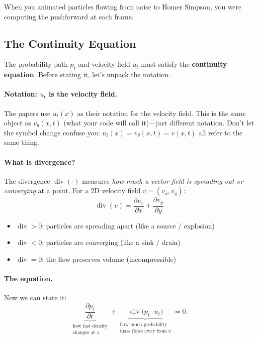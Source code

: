 \documentclass[11pt, a4paper]{article}
\newcommand{\vtheta}{v_\theta}
\DeclareMathOperator{\Div}{div}
\begin{document}
When you animated particles flowing from noise to Homer Simpson, you were
computing the pushforward at each frame.


\subsection{The Continuity Equation}
\label{sec:continuity}

The probability path $p_t$ and velocity field $u_t$ must satisfy the
\textbf{continuity equation}.  Before stating it, let's unpack the notation.

\paragraph{Notation: $u_t$ is the velocity field.}
The papers use $u_t(x)$ as their notation for the velocity field.  This is
the same object as $\vtheta(x,t)$ (what your code will call it)---just
different notation.  Don't let the symbol change confuse you:
$u_t(x) = \vtheta(x,t) = v(x,t)$ all refer to the same thing.

\paragraph{What is divergence?}
The divergence $\Div(\cdot)$ measures \emph{how much a vector field is
spreading out or converging} at a point.  For a 2D velocity field
$v = (v_x, v_y)$:
\[
  \Div(v) = \frac{\partial v_x}{\partial x} + \frac{\partial v_y}{\partial y}
\]

\begin{itemize}
  \item $\Div > 0$: particles are spreading apart (like a source / explosion)
  \item $\Div < 0$: particles are converging (like a sink / drain)
  \item $\Div = 0$: the flow preserves volume (incompressible)
\end{itemize}

\paragraph{The equation.}
Now we can state it:
\begin{equation}
  \label{eq:continuity}
  \underbrace{\frac{\partial p_t}{\partial t}}_{\substack{
    \text{how fast density} \\ \text{changes at } x}}
  + \underbrace{\Div\bigl(p_t \cdot u_t\bigr)}_{\substack{
    \text{how much probability} \\ \text{mass flows away from } x}}
  = 0.
\end{equation}
\end{document}
